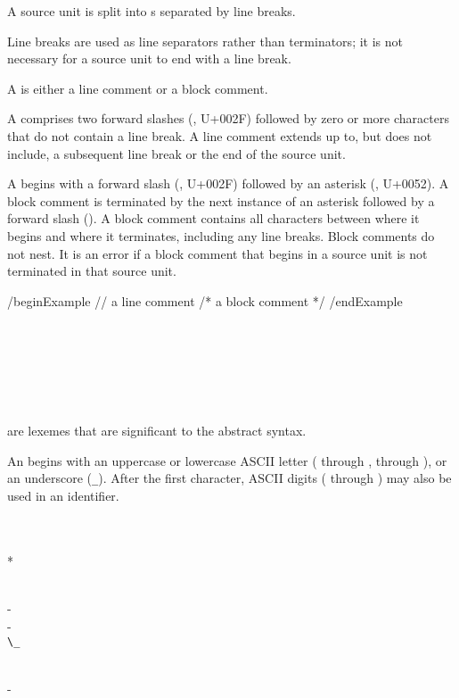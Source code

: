 A source unit is split into s separated by line breaks.

\begin{Note}
Line breaks are used as line separators rather than terminators; it is not necessary for a source unit to end with a line break.
\end{Note}


A  is either a line comment or a block comment.

A  comprises two forward slashes (\Char{/}, U+002F) followed by zero or more characters that do not contain a line break.
A line comment extends up to, but does not include, a subsequent line break or the end of the source unit.

A  begins with a forward slash (\Char{/}, U+002F) followed by an asterisk (\Char{*}, U+0052). 
A block comment is terminated by the next instance of an asterisk followed by a forward slash (\Char{*/}).
A block comment contains all characters between where it begins and where it terminates, including any line breaks.
Block comments do not nest.
It is an error if a block comment that begins in a source unit is not terminated in that source unit.

/begin{Example}
 // a line comment
 /* a block comment */
/end{Example}


\begin{Lexical}
     \\
         \\
    \SynOr {} \\
    \SynOr {} \\
    \SynOr {} \\
\end{Lexical}

 are lexemes that are significant to the abstract syntax.


An  begins with an uppercase or lowercase ASCII letter ( through ,  through ), or an underscore (\lstinline{_}).
After the first character, ASCII digits ( through ) may also be used in an identifier.

\begin{Lexical}
     \\
         \\
        \SynOr {}*

     \\
        - \\
        \SynOr {}- \\
        \SynOr \lstinline{\_}

     \\
        \SynOr {}-        
\end{Lexical}

